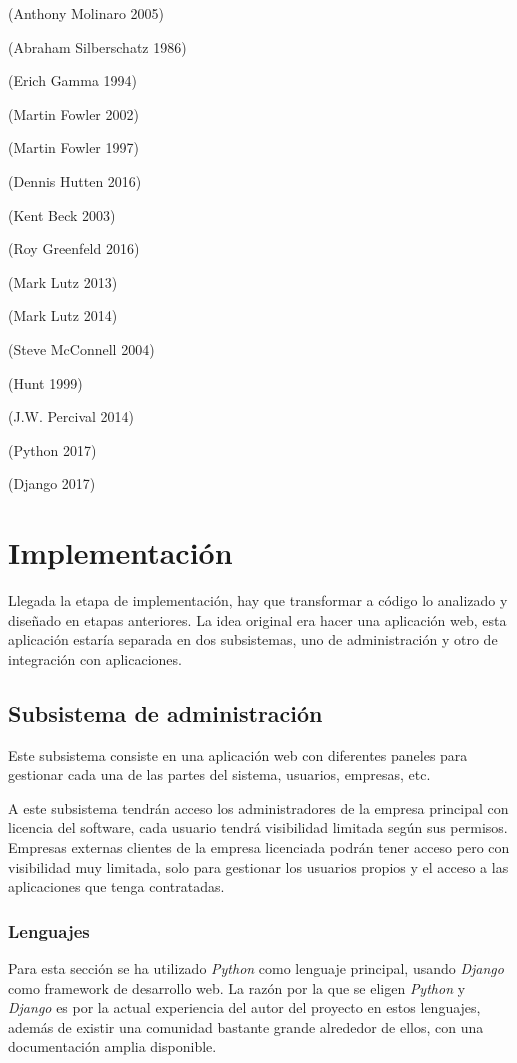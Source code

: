 \documentclass[12pt,a4paperpaper,]{report}
\begin{document}
(Anthony Molinaro 2005)

(Abraham Silberschatz 1986)

(Erich Gamma 1994)

(Martin Fowler 2002)

(Martin Fowler 1997)

(Dennis Hutten 2016)

(Kent Beck 2003)

(Roy Greenfeld 2016)

(Mark Lutz 2013)

(Mark Lutz 2014)

(Steve McConnell 2004)

(Hunt 1999)

(J.W. Percival 2014)

(Python 2017)

(Django 2017)

\chapter{Implementación}\label{implementaciuxf3n-1}

Llegada la etapa de implementación, hay que transformar a código lo
analizado y diseñado en etapas anteriores. La idea original era hacer
una aplicación web, esta aplicación estaría separada en dos subsistemas,
uno de administración y otro de integración con aplicaciones.

\section{Subsistema de
administración}\label{subsistema-de-administraciuxf3n}

Este subsistema consiste en una aplicación web con diferentes paneles
para gestionar cada una de las partes del sistema, usuarios, empresas,
etc.

A este subsistema tendrán acceso los administradores de la empresa
principal con licencia del software, cada usuario tendrá visibilidad
limitada según sus permisos. Empresas externas clientes de la empresa
licenciada podrán tener acceso pero con visibilidad muy limitada, solo
para gestionar los usuarios propios y el acceso a las aplicaciones que
tenga contratadas.

\subsection{Lenguajes}\label{lenguajes}

Para esta sección se ha utilizado \emph{Python} como lenguaje principal,
usando \emph{Django} como framework de desarrollo web. La razón por la
que se eligen \emph{Python} y \emph{Django} es por la actual experiencia
del autor del proyecto en estos lenguajes, además de existir una
comunidad bastante grande alrededor de ellos, con una documentación
amplia disponible.
\end{document}
